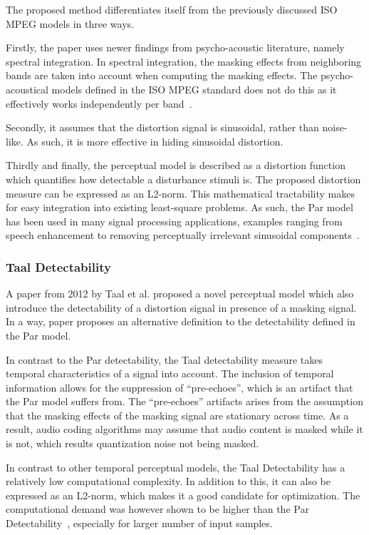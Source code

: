 The proposed method differentiates itself from the previously discussed ISO MPEG models in three ways.

Firstly, the paper uses newer findings from psycho-acoustic literature, namely spectral integration.
In spectral integration, the masking effects from neighboring bands are taken into account when computing the 
masking effects.
The psycho-acoustical models defined in the ISO MPEG standard does not do this as it effectively 
works independently per band~\cite{taal2012low}.

Secondly, it assumes that the distortion signal is sinusoidal, rather than noise-like.
As such, it is more effective in hiding sinusoidal distortion.

Thirdly and finally, the perceptual model is described as a distortion function which quantifies how 
detectable a disturbance stimuli is.
The proposed distortion measure can be expressed as an L2-norm.
This mathematical tractability makes for easy integration into existing least-square problems.
As such, the Par model has been used in many signal processing applications, 
examples ranging from speech enhancement to removing perceptually irrelevant sinusoidal 
components~\cite{balazs2009time, taal2013optimal}.

\subsubsection{Taal Detectability}
A paper from 2012 by Taal et al. proposed a novel perceptual model \cite{taal2012low} which also introduce the
detectability of a distortion signal in presence of a masking signal.
In a way, paper proposes an alternative definition to the detectability defined in the Par model.

In contrast to the Par detectability, the Taal detectability measure takes temporal characteristics of a signal into account.
The inclusion of temporal information allows for the suppression of ``pre-echoes'', which is an artifact that 
the Par model suffers from. 
The ``pre-echoes'' artifacts arises from the assumption that the masking effects of the masking signal are stationary across 
time. 
As a result, audio coding algorithms may assume that audio content is masked while it is not, which results quantization
noise not being masked.

In contrast to other temporal perceptual models, the Taal Detectability has a relatively low computational complexity.
In addition to this, it can also be expressed as an L2-norm, which makes it a good candidate for optimization.
The computational demand was however shown to be higher than the Par Detectability~\cite{taal2012low}, especially for larger number of input samples.

